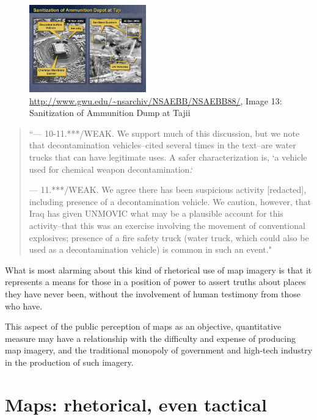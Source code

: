 \documentclass[11pt]{report}
\begin{document}
\begin{figure}
	\begin{flushright}
		\includegraphics[width=0.45\textwidth]{images/iraq-image-13.jpg}
		\url{http://www.gwu.edu/~nsarchiv/NSAEBB/NSAEBB88/}, Image 13: Sanitization of Ammunition Dump at Tajii	
	\end{flushright}
\end{figure}

\begin{quote}
	``--- 10-11.***/WEAK. We support much of this discussion, but we note that decontamination vehicles--cited several times in the text--are water trucks that can have legitimate uses. A safer characterization is, `a vehicle used for chemical weapon decontamination.`

--- 11.***/WEAK. We agree there has been suspicious activity [redacted], including presence of a decontamination vehicle. We caution, however, that Iraq has given UNMOVIC what may be a plausible account for this activity--that this was an exercise involving the movement of conventional explosives; presence of a fire safety truck (water truck, which could also be used as a decontamination vehicle) is common in such an event."
	\cite{senate2004report}
\end{quote} 

What is most alarming about this kind of rhetorical use of map imagery is that it represents a means for those in a position of power to assert truths about places they have never been, without the involvement of human testimony from those who have.

This aspect of the public perception of maps as an objective, quantitative measure may have a relationship with the difficulty and expense of producing map imagery, and the traditional monopoly of government and high-tech industry in the production of such imagery.

\section{Maps: rhetorical, even tactical}
\end{document}
